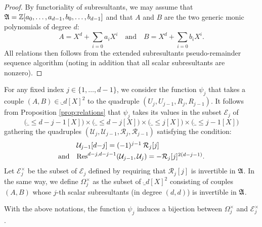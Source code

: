 \documentclass{sig-alternate}
\begin{document}
\begin{proof}
By functoriality of subresultants, we may assume that $\mathfrak A = 
\mathbb Z[a_0, \ldots, a_{d-1}, b_0, \ldots, b_{d-1}]$ and that $A$ and $B$
are the two generic monic polynomials of degree $d$:
$$A = X^d + \sum_{i=0} a_i X^i \quad \text{and} \quad
B = X^d + \sum_{i=0} b_i X^i.$$
All relations then follows from the extended subresultants 
pseudo-remainder sequence algorithm (noting in addition that all
scalar subresultants are nonzero).
\end{proof}

For any fixed index $j \in \{1, \ldots, d-1\}$, we consider the 
function $\psi_j$ that takes a couple $(A,B) \in \ring_d[X]^2$ to the
quadruple $(U_j, U_{j-1}, R_j, R_{j-1})$. It follows from Proposition
\ref{prop:relations} that $\psi_j$ takes its values in the subset 
$\mathcal E_j$ of
$$\big(\ring_{\leq d-j-1}[X]\big) \times \big(\ring_{\leq d-j}[X]\big) \times 
\big(\ring_{\leq j}[X]\big) \times \big(\ring_{\leq j-1}[X]\big)$$
gathering the quadruples $(\mathcal U_j, \mathcal U_{j-1}, \mathcal
R_j, \mathcal R_{j-1})$ satisfying the condition:
$$\begin{array}{ll}
&\mathcal U_{j-1}[d{-}j] = (-1)^{j-1} \: \mathcal R_j[j] \smallskip \\
\text{and} &
\Res^{d-j,d-j-1}(\mathcal U_{j-1}, \mathcal U_j) = -\mathcal R_j[j]^{2(d-j-1)}.
\end{array}$$
Let $\mathcal E_j^\times$ be the subset of $\mathcal E_j$ defined by 
requiring that $\mathcal R_j[j]$ is invertible in $\mathfrak A$. In the same 
way, we define $\Omega_j^\times$ as the subset of $\ring_d[X]^2$ 
consisting of couples $(A,B)$ whose $j$-th scalar subresultants (in 
degree $(d,d)$) is invertible in $\mathfrak A$.

\begin{prop}
\label{prop:bijection}
With the above notations, the function $\psi_j$ induces a bijection between
$\Omega_j^\times$ and $\mathcal E_j^\times$.
\end{prop}
\end{document}
